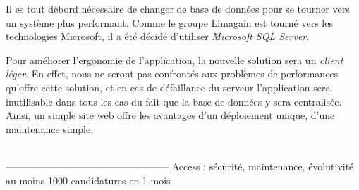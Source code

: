Il es tout débord nécessaire de changer de base de données pour se tourner vers un système plus performant.
Comme le groupe Limagain est tourné vers les technologies Microsoft, il a été décidé d'utiliser \textit{Microsoft SQL Server}.

Pour améliorer l'ergonomie de l'application, la nouvelle solution sera un \textit{client léger}.
En effet, nous ne seront pas confrontés aux problèmes de performances qu'offre cette solution, et en cas de défaillance du serveur l'application sera inutilisable dans tous les cas du fait que la base de données y sera centralisée.
Ainsi, un simple site web offre les avantages d'un déploiement unique, d'une maintenance simple.

~~\\--------------------------------------------------
Access : sécurité, maintenance, évolutivité
au moins 1000 candidatures en 1 mois